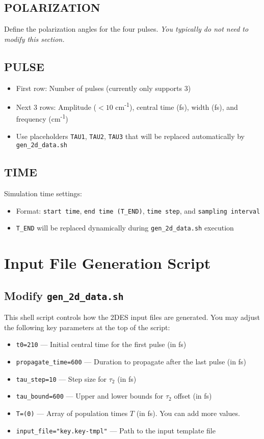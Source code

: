 \documentclass{article}
\begin{document}
\subsection*{POLARIZATION}
Define the polarization angles for the four pulses.  
\textit{You typically do not need to modify this section.}

\subsection*{PULSE}
\begin{itemize}
    \item First row: Number of pulses (currently only supports 3)
    \item Next 3 rows: Amplitude (\(< 10\) cm\textsuperscript{-1}), central time (fs), width (fs), and frequency (cm\textsuperscript{-1})
    \item Use placeholders \texttt{TAU1}, \texttt{TAU2}, \texttt{TAU3} that will be replaced automatically by \texttt{gen\_2d\_data.sh}
\end{itemize}

\subsection*{TIME}
Simulation time settings:
\begin{itemize}
    \item Format: \texttt{start time}, \texttt{end time (T\_END)}, \texttt{time step}, and \texttt{sampling interval}
    \item \texttt{T\_END} will be replaced dynamically during \texttt{gen\_2d\_data.sh} execution
\end{itemize}

\newpage

\section{Input File Generation Script}

\subsection*{Modify \texttt{gen\_2d\_data.sh}}

This shell script controls how the 2DES input files are generated. You may adjust the following key parameters at the top of the script:

\begin{itemize}
    \item \texttt{t0=210} — Initial central time for the first pulse (in fs)
    \item \texttt{propagate\_time=600} — Duration to propagate after the last pulse (in fs)
    \item \texttt{tau\_step=10} — Step size for \(\tau_2\) (in fs)
    \item \texttt{tau\_bound=600} — Upper and lower bounds for \(\tau_2\) offset (in fs)
    \item \texttt{T=(0)} — Array of population times \(T\) (in fs). You can add more values.
    \item \texttt{input\_file="key.key-tmpl"} — Path to the input template file
\end{itemize}
\end{document}
